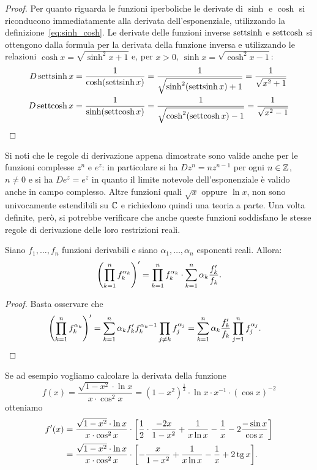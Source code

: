 \begin{proof}
Per quanto riguarda le funzioni iperboliche le derivate di $\sinh$
e $\cosh$ si riconducono immediatamente alla derivata dell'esponenziale,
utilizzando
la definizione~\eqref{eq:sinh_cosh}. Le derivate delle funzioni
inverse $\operatorname{settsinh}$ e $\operatorname{settcosh}$ si ottengono dalla formula per la derivata
della funzione inversa e utilizzando
le relazioni $\cosh x = \sqrt{\sinh^2 x+1}$ e, per $x > 0$,
$\sinh x = \sqrt{\cosh^2 x -1}$:
\begin{align*}
  D \operatorname{settsinh} x &= \frac{1}{\cosh(\operatorname{settsinh} x)}
  = \frac{1}{\sqrt{\sinh^2 (\operatorname{settsinh} x) + 1}} = \frac{1}{\sqrt{x^2+1}}\\
  D \operatorname{settcosh} x &= \frac{1}{\sinh(\operatorname{settcosh} x)}
  = \frac{1}{\sqrt{\cosh^2(\operatorname{settcosh} x)-1}}
  = \frac{1}{\sqrt{x^2-1}}
\end{align*}
\end{proof}

Si noti che le regole di derivazione appena dimostrate 
sono valide anche per le funzioni complesse $z^n$ e $e^z$:
in particolare si ha $D z^n = nz^{n-1}$ per ogni $n\in {\mathbb Z}$,
$n\neq 0$ e si ha $D e^z = e^z$ in quanto il limite 
notevole dell'esponenziale è valido anche in campo complesso.
Altre funzioni quali $\sqrt{x}$ 
oppure $\ln x$, non sono univocamente estendibili su ${\mathbb C}$
e richiedono quindi una teoria a parte. 
Una volta definite, però, si potrebbe verificare 
che anche queste funzioni soddisfano le stesse regole di derivazione 
delle loro restrizioni reali.

\begin{proposition}
Siano $f_1,\dots, f_n$ funzioni derivabili e siano $\alpha_1,\dots, \alpha_n$ 
esponenti reali. Allora:
  \[
  {\left( \prod_{k=1}^n f_k^{\alpha_k} \right)}'
  = \prod_{k=1}^n f_k^{\alpha_k} \cdot \sum_{k=1}^n \alpha_k \frac{f_k'}{f_k}.
  \]
\end{proposition}
\begin{proof}
Basta osservare che 
\begin{align*}
  {\left( \prod_{k=1}^n f_k^{\alpha_k} \right)}'
  &= \sum_{k=1}^n \alpha_k f_k' f_k^{\alpha_k-1} \prod_{j\neq k} f_j^{\alpha_j}
  = \sum_{k=1}^n \alpha_k \frac{f_k'}{f_k} \prod_{j=1}^n f_j^{\alpha_j}.
\end{align*}
\end{proof}
Se ad esempio vogliamo calcolare la derivata della funzione 
\[
 f(x) = \frac{\sqrt{1-x^2}\cdot \ln x}{x\cdot \cos^2 x}
 = (1-x^2)^{\frac 1 2} \cdot \ln x \cdot x^{-1}\cdot (\cos x)^{-2}
\]
otteniamo 
\begin{align*}
  f'(x) 
  &= \frac{\sqrt{1-x^2}\cdot \ln x}{x\cdot \cos^2 x}
  \cdot {\left[ \frac 1 2 \cdot \frac{-2x}{1-x^2} + \frac{1}{x\ln x} - \frac{1}{x}-2\frac{-\sin x}{\cos x} \right]}\\
  &=\frac{\sqrt{1-x^2}\cdot \ln x}{x\cdot \cos^2 x}
  \cdot {\left[ -\frac{x}{1-x^2} + \frac{1}{x\ln x} - \frac{1}{x}+2\operatorname{tg}x \right]}.
\end{align*}

